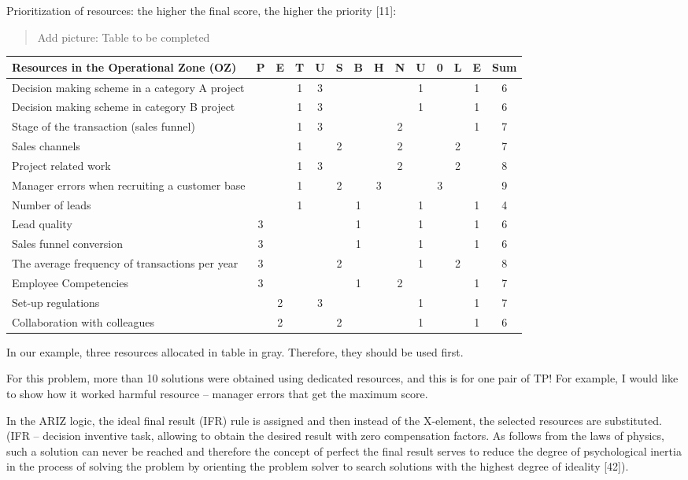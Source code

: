 \documentclass[11pt,a4paper]{book}
\newcommand{\addpicture}[1]{
  \begin{quote} Add picture: #1\end{quote}
}
\begin{document}
Prioritization of resources: the higher the final score, the higher the
priority [11]:

\addpicture{Table to be completed}

\begin{center}
  \begin{tabular}{|p{5cm}|*{3}{c|}|*{3}{c|}|*{3}{c|}|*{3}{c|}|c|}\hline
    \textbf{Resources in the Operational Zone (OZ)}
    &P&E&T&U&S&B&H&N&U&0&L&E&Sum\\\hline
 Decision making scheme in a category A project&&&1&3&&&&&1&&&1&6\\
 Decision making scheme in category B project  &&&1&3&&&&&1&&&1&6\\
 Stage of the transaction (sales funnel)       &&&1&3&&&&2&&&&1&7\\
 Sales channels                                &&&1&&2&&&2&&&2&&7\\
 Project related work                          &&&1&3&&&&2&&&2&&8\\
 Manager errors when recruiting a customer base&&&1&&2&&3&&&3&&&9\\
 Number of leads                               &&&1&&&1&&&1&&&1&4\\
 Lead quality                                  &3&&&&&1&&&1&&&1&6\\
 Sales funnel conversion                       &3&&&&&1&&&1&&&1&6\\
 The average frequency of transactions per year&3&&&&2&&&&1&&2&&8\\
 Employee Competencies                         &3&&&&&1&&2&&&&1&7\\
 Set-up regulations                            &&2&&3&&&&&1&&&1&7\\
 Collaboration with colleagues                 &&2&&&2&&&&1&&&1&6\\\hline
  \end{tabular}
\end{center}

In our example, three resources allocated in table in gray. Therefore, they
should be used first.

For this problem, more than 10 solutions were obtained using dedicated
resources, and this is for one pair of TP! For example, I would like to show
how it worked harmful resource -- manager errors that get the maximum score.

In the ARIZ logic, the ideal final result (IFR) rule is assigned and then
instead of the X-element, the selected resources are substituted. (IFR --
decision inventive task, allowing to obtain the desired result with zero
compensation factors. As follows from the laws of physics, such a solution can
never be reached and therefore the concept of perfect the final result serves
to reduce the degree of psychological inertia in the process of solving the
problem by orienting the problem solver to search solutions with the highest
degree of ideality [42]).
\end{document}
